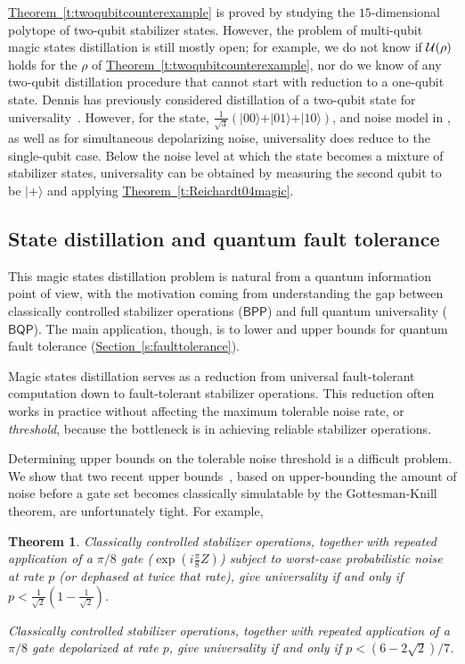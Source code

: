 \documentclass[11pt]{article}
\def\ket #1{\vert #1\rangle}
\newtheorem{theorem}{Theorem}  %
\theoremstyle{note}
\newcommand{\thmref}[1]{\hyperref[#1]{{Theorem~\ref*{#1}}}}
\newcommand{\secref}[1]{\hyperref[#1]{{Section~\ref*{#1}}}}
\newcommand{\BQP}{{\mathsf{BQP}}}
\begin{document}
\thmref{t:twoqubitcounterexample} is proved by studying the $15$-dimensional polytope of two-qubit stabilizer states.  However, the problem of multi-qubit magic states distillation is still mostly open; for example, we do not know if $\mathcal{U}(\rho)$ holds for the $\rho$ of \thmref{t:twoqubitcounterexample}, nor do we know of any two-qubit distillation procedure that cannot start with reduction to a one-qubit state.  Dennis has previously considered distillation of a two-qubit state for universality~\cite{Dennis01distill}.  However, for the state, $\tfrac{1}{\sqrt{3}}(\ket{00}+\ket{01}+\ket{10})$, and noise model in \cite{Dennis01distill}, as well as for simultaneous depolarizing noise, universality does reduce to the single-qubit case.  Below the noise level at which the state becomes a mixture of stabilizer states, universality can be obtained by measuring the second qubit to be $\ket{+}$ and applying \thmref{t:Reichardt04magic}.


\subsection{State distillation and quantum fault tolerance}

This magic states distillation problem is natural from a quantum information point of view, with the motivation coming from understanding the gap between classically controlled stabilizer operations ($\mathsf{BPP}$) and full quantum universality ($\BQP$).  The main application, though, is to lower and upper bounds for quantum fault tolerance (\secref{s:faulttolerance}).  

Magic states distillation serves as a reduction from universal fault-tolerant computation down to fault-tolerant stabilizer operations.  This reduction often works in practice without affecting the maximum tolerable noise rate, or \emph{threshold}, because the bottleneck is in achieving reliable stabilizer operations.  

Determining upper bounds on the tolerable noise threshold is a difficult problem.  We show that two recent upper bounds~\cite{VirmaniHuelgaPlenio,BuhrmanCleveLaurentLindenSchrijverUnger06}, based on upper-bounding the amount of noise before a gate set becomes classically simulatable by the Gottesman-Knill theorem, are unfortunately tight.  For example, 

\begin{theorem} \label{t:pipereighttheorem}
Classically controlled stabilizer operations, together with repeated application of a $\pi/8$ gate ($\exp(i \tfrac{\pi}{8}Z)$) subject to worst-case probabilistic noise at rate $p$ (or dephased at twice that rate), give universality if and only if $p < \tfrac{1}{\sqrt{2}}(1 - \tfrac{1}{\sqrt{2}})$.

Classically controlled stabilizer operations, together with repeated application of a $\pi/8$ gate depolarized at rate $p$, give universality if and only if $p < (6-2\sqrt{2})/7$.
\end{theorem}
\end{document}
